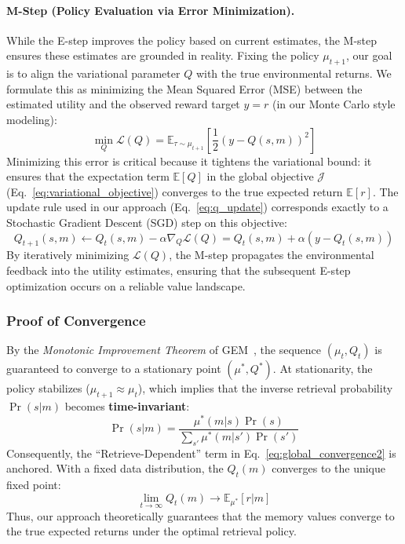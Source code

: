 \documentclass{article}
\theoremstyle{plain}
\theoremstyle{definition}
\theoremstyle{remark}
\begin{document}
\paragraph{M-Step (Policy Evaluation via Error Minimization).} 
While the E-step improves the policy based on current estimates, the M-step ensures these estimates are grounded in reality. Fixing the policy $\mu_{t+1}$, our goal is to align the variational parameter $Q$ with the true environmental returns. We formulate this as minimizing the Mean Squared Error (MSE) between the estimated utility and the observed reward target $y = r$ (in our Monte Carlo style modeling):
\begin{equation}
\min_Q \mathcal{L}(Q) = \mathbb{E}_{\tau \sim \mu_{t+1}} \left[ \frac{1}{2} \left( y - Q(s, m) \right)^2 \right]
\end{equation}
Minimizing this error is critical because it tightens the variational bound: it ensures that the expectation term $\mathbb{E}[Q]$ in the global objective $\mathcal{J}$ (Eq.~\ref{eq:variational_objective}) converges to the true expected return $\mathbb{E}[r]$.
The update rule used in our approach (Eq.~\ref{eq:q_update}) corresponds exactly to a Stochastic Gradient Descent (SGD) step on this objective:
\begin{equation*}
Q_{t+1}(s, m) \leftarrow Q_t(s, m) - \alpha \nabla_Q \mathcal{L}(Q) = Q_t(s, m) + \alpha (y - Q_t(s, m))
\end{equation*}
By iteratively minimizing $\mathcal{L}(Q)$, the M-step propagates the environmental feedback into the utility estimates, ensuring that the subsequent E-step optimization occurs on a reliable value landscape.

\subsubsection{Proof of Convergence}
By the \textit{Monotonic Improvement Theorem} of GEM~\citep{neal1998view}, the sequence $(\mu_t, Q_t)$ is guaranteed to converge to a stationary point $(\mu^*, Q^*)$.
At stationarity, the policy stabilizes ($\mu_{t+1} \approx \mu_t$), which implies that the inverse retrieval probability $\Pr(s|m)$ becomes \textbf{time-invariant}:
\begin{equation*}
\Pr(s|m) = \frac{\mu^*(m|s)\Pr(s)}{\sum_{s'} \mu^*(m|s')\Pr(s')}
\end{equation*}
Consequently, the ``Retrieve-Dependent'' term in Eq.~\ref{eq:global_convergence2} is anchored. With a fixed data distribution, the  $Q_t(m)$ converges to the unique fixed point:
\begin{equation}
\lim_{t \to \infty} Q_t(m) \to \mathbb{E}_{\mu^*}[r | m]
\end{equation}
Thus, our approach theoretically guarantees that the memory values converge to the true expected returns under the optimal retrieval policy.
\end{document}
